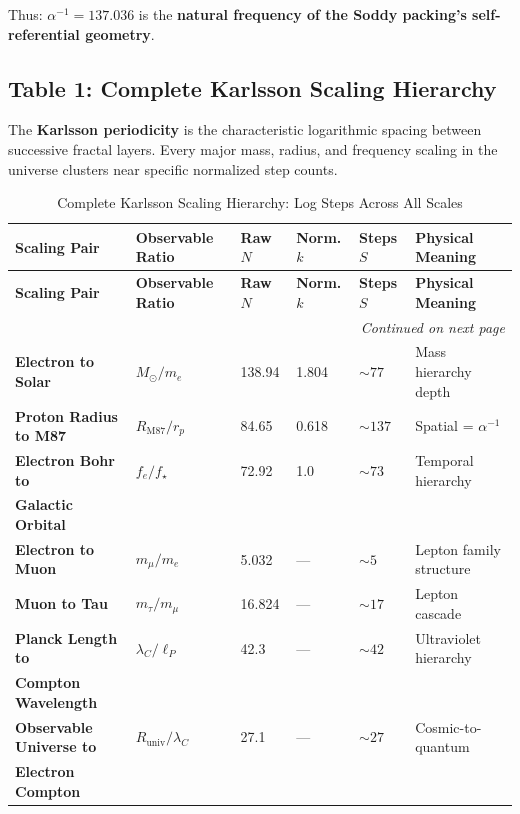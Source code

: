 \documentclass[11pt,a4paper]{article}
\begin{document}
Thus: $\alpha^{-1} = 137.036$ is the \textbf{natural frequency of the Soddy packing's self-referential geometry}.


\subsection{Table 1: Complete Karlsson Scaling Hierarchy}

The \textbf{Karlsson periodicity} is the characteristic logarithmic spacing between successive fractal layers. Every major mass, radius, and frequency scaling in the universe clusters near specific normalized step counts.

\begin{longtable}{|p{2.8cm}|p{2.5cm}|p{1.8cm}|p{1.6cm}|p{1.4cm}|p{2.2cm}|}
\caption{Complete Karlsson Scaling Hierarchy: Log Steps Across All Scales} \\
\hline
\textbf{Scaling Pair} & \textbf{Observable Ratio} & \textbf{Raw $N$} & \textbf{Norm. $k$} & \textbf{Steps $S$} & \textbf{Physical Meaning} \\
\hline
\endfirsthead
\hline
\textbf{Scaling Pair} & \textbf{Observable Ratio} & \textbf{Raw $N$} & \textbf{Norm. $k$} & \textbf{Steps $S$} & \textbf{Physical Meaning} \\
\hline
\endhead
\hline
\multicolumn{6}{r|}{\textit{Continued on next page}} \\
\endfoot
\hline
\endlastfoot
\textbf{Electron to Solar} & $M_{\odot}/m_e$ & 138.94 & 1.804 & $\sim 77$ & Mass hierarchy depth \\
\hline
\textbf{Proton Radius to M87} & $R_{\mathrm{M87}}/r_p$ & 84.65 & 0.618 & $\sim 137$ & Spatial = $\alpha^{-1}$ \\
\hline
\textbf{Electron Bohr to} & $f_e/f_{\star}$ & 72.92 & 1.0 & $\sim 73$ & Temporal hierarchy \\
\textbf{Galactic Orbital} & & & & & \\
\hline
\textbf{Electron to Muon} & $m_{\mu}/m_e$ & 5.032 & — & $\sim 5$ & Lepton family structure \\
\hline
\textbf{Muon to Tau} & $m_{\tau}/m_{\mu}$ & 16.824 & — & $\sim 17$ & Lepton cascade \\
\hline
\textbf{Planck Length to} & $\lambda_C/\ell_P$ & 42.3 & — & $\sim 42$ & Ultraviolet hierarchy \\
\textbf{Compton Wavelength} & & & & & \\
\hline
\textbf{Observable Universe to} & $R_{\text{univ}}/\lambda_C$ & 27.1 & — & $\sim 27$ & Cosmic-to-quantum \\
\textbf{Electron Compton} & & & & & \\
\hline
\end{longtable}
\end{document}
